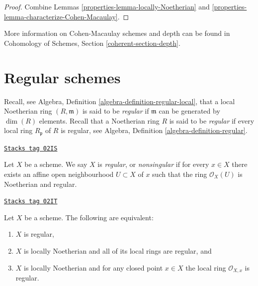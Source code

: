 \begin{proof}

Combine Lemmas \ref{properties-lemma-locally-Noetherian}
and \ref{properties-lemma-characterize-Cohen-Macaulay}.
\end{proof}

More information on Cohen-Macaulay schemes and depth can be found in
Cohomology of Schemes, Section \ref{coherent-section-depth}.

\section{Regular schemes}
\label{properties-section-regular}
Recall, see Algebra, Definition \ref{algebra-definition-regular-local},
that a local Noetherian ring $(R, \mathfrak m)$ is
said to be {\it regular} if $\mathfrak m$ can be generated
by $\dim(R)$ elements.
Recall that a Noetherian ring $R$ is said to be {\it regular} if
every local ring $R_{\mathfrak p}$ of $R$ is regular,
see Algebra, Definition \ref{algebra-definition-regular}.

\begin{definition}[Regular]
\label{properties-definition-regular}
\href{https://stacks.math.columbia.edu/tag/02IS}{\texttt{Stacks tag 02IS}}

Let $X$ be a scheme. We say $X$ is {\it regular}, or {\it nonsingular} if
for every $x \in X$ there exists an affine open neighbourhood
$U \subset X$ of $x$ such that the ring $\mathcal{O}_X(U)$ is
Noetherian and regular.
\end{definition}

\begin{lemma}
\label{properties-lemma-characterize-regular}
\href{https://stacks.math.columbia.edu/tag/02IT}{\texttt{Stacks tag 02IT}}

Let $X$ be a scheme. The following are equivalent:
\begin{enumerate}
\item $X$ is regular,
\item $X$ is locally Noetherian and all of its local rings are regular,
and
\item $X$ is locally Noetherian and for any closed point $x \in X$
the local ring $\mathcal{O}_{X, x}$ is regular.
\end{enumerate}
\end{lemma}

